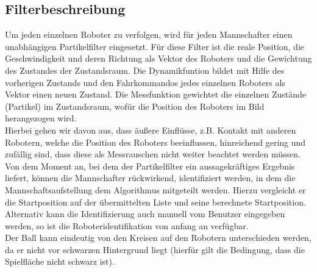 \documentclass{ezb}
\begin{document}
\subsection{Filterbeschreibung}
Um jeden einzelnen Roboter zu verfolgen, wird für jeden Mannschafter einen unabhängigen Partikelfilter eingesetzt.
Für diese Filter ist die reale Position, die Geschwindigkeit und deren Richtung als Vektor des Roboters und die Gewichtung des Zustandes der Zustandsraum. Die Dynamikfuntion bildet mit Hilfe des vorherigen Zustands und den Fahrkommandos jedes einzelnen Roboters als Vektor einen neuen Zustand. Die Messfunktion gewichtet die einzelnen Zustände (Partikel) im Zustandsraum, wofür die Position des Roboters im Bild herangezogen wird. \\
\linebreak
Hierbei gehen wir davon aus, dass äußere Einflüsse, z.B. Kontakt mit anderen Robotern, welche die Position des Roboters beeinflussen, hinreichend gering und zufällig sind, dass diese als Messrauschen nicht weiter beachtet werden müssen.\\
\linebreak
Von dem Moment an, bei dem der Partikelfilter ein aussagekräftiges Ergebnis liefert, können die Mannschafter rückwirkend, identifiziert werden, in dem die Mannschaftsaufstellung dem Algorithmus mitgeteilt werden. Hierzu vergleicht er die Startposition auf der übermittelten Liste und seine berechnete Startposition. Alternativ kann die Identifizierung auch manuell vom Benutzer eingegeben werden, so ist die Roboteridentifikation von anfang an verfügbar.\\
\linebreak
Der Ball kann eindeutig von den Kreisen auf den Robotern unterschieden werden, da er nicht vor schwarzen Hintergrund liegt (hierfür gilt die Bedingung, dass die Spielfläche nicht schwarz ist).\\
\linebreak
\end{document}

